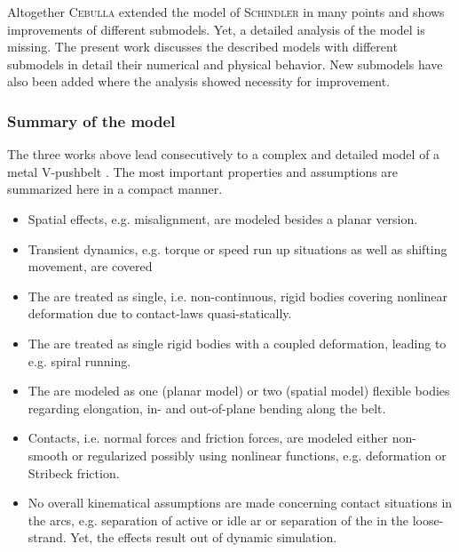Altogether \textsc{Cebulla} extended the model of \textsc{Schindler} in many points and shows improvements of different submodels.
Yet, a detailed analysis of the model is missing. 
The present work discusses the described models with different submodels in detail \wrt their numerical and physical behavior.
New submodels have also been added where the analysis showed necessity for improvement.

\subsubsection{Summary of the model}

The three works above lead consecutively to a complex and detailed model of a metal V-pushbelt \CVT.
The most important properties and assumptions are summarized here in a compact manner. 

\begin{itemize}
  \item Spatial effects, e.g. misalignment, are modeled besides a planar version.
  \item Transient dynamics, e.g. torque or speed run up situations as well as shifting movement, are covered
  \item The \els are treated as single, i.e. non-continuous, rigid bodies covering nonlinear deformation due to contact-laws quasi-statically.
  \item The \sheaves are treated as single rigid bodies with a coupled deformation, leading to e.g. spiral running.
  \item The \rings are modeled as one (planar model) or two (spatial model) flexible bodies regarding elongation, in- and out-of-plane bending along the belt.
  \item Contacts, i.e. normal forces and friction forces, are modeled either non-smooth or regularized possibly using nonlinear functions, e.g. \el deformation or Stribeck friction.
  \item No overall kinematical assumptions are made concerning contact situations in the arcs, e.g. separation of active or idle ar or separation of the \els in the loose-strand. 
  Yet, the effects result out of dynamic simulation.
\end{itemize}

